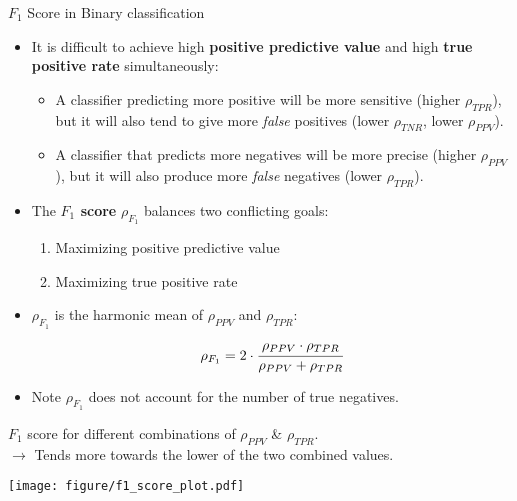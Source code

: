 \begin{vbframe}{$F_1$ Score in Binary classification}
	
	\small
	
	\begin{itemize}
		\item It is difficult to achieve high \textbf{positive predictive value} and 
		high \textbf{true positive rate} simultaneously:
		\begin{itemize}
			\small
			\item A classifier predicting more positive will be more 
			sensitive (higher $\rho_{TPR}$), but it will also tend to give more 
			\textit{false} positives (lower $\rho_{TNR}$, lower $\rho_{PPV}$).
			\item A classifier that predicts more negatives will be more precise 
			(higher $\rho_{PPV}$), but it will also produce more \textit{false} negatives 
			(lower $\rho_{TPR}$).
		\end{itemize}
	
	\item The \textbf{$F_1$ score} 	$\rho_{F_1}$ balances two conflicting goals:\\%
	\begin{enumerate}
		\small
		\item Maximizing positive predictive value
		\item Maximizing true positive rate \\%
	\end{enumerate}
	
	\item 	$\rho_{F_1}$ is the harmonic mean of $\rho_{PPV}$ and $\rho_{TPR}$:
	$$\rho_{F_1} = 2 \cdot \cfrac{\rho_{PPV} \cdot \rho_{TPR}}{\rho_{PPV} + 
		\rho_{TPR}}$$
	
	\item Note $\rho_{F_1}$ does not account for the number of true negatives.
	
	\end{itemize}

	\framebreak
	
	\footnotesize
	
	\begin{minipage}[c]{0.5\textwidth}
		\footnotesize
		$F_1$ score for different combinations of $\rho_{PPV}$ \& $\rho_{TPR}$. \\
		$\rightarrow$ Tends more towards the lower of the two combined values.
	\end{minipage}%
	\begin{minipage}[c]{0.5\textwidth}
		\centering
		\texttt{[image: figure/f1\_score\_plot.pdf]}
	\end{minipage}
	

\end{vbframe}
